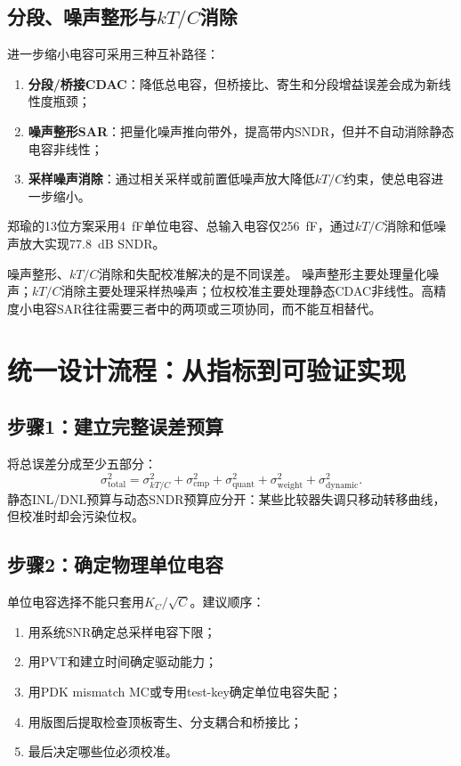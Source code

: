 \documentclass[UTF8,a4paper,11pt]{ctexart}
\begin{document}
\subsection{分段、噪声整形与\texorpdfstring{$kT/C$}{kT/C}消除}

进一步缩小电容可采用三种互补路径：
\begin{enumerate}
  \item \textbf{分段/桥接CDAC}：降低总电容，但桥接比、寄生和分段增益误差会成为新线性度瓶颈；
  \item \textbf{噪声整形SAR}：把量化噪声推向带外，提高带内SNDR，但并不自动消除静态电容非线性；
  \item \textbf{采样噪声消除}：通过相关采样或前置低噪声放大降低$kT/C$约束，使总电容进一步缩小。
\end{enumerate}
郑瑜的13位方案采用\SI{4}{fF}单位电容、总输入电容仅\SI{256}{fF}，通过$kT/C$消除和低噪声放大实现\SI{77.8}{dB} SNDR。\cite{zheng2024}

\begin{warnbox}{噪声整形、$kT/C$消除和失配校准解决的是不同误差。}
噪声整形主要处理量化噪声；$kT/C$消除主要处理采样热噪声；位权校准主要处理静态CDAC非线性。高精度小电容SAR往往需要三者中的两项或三项协同，而不能互相替代。
\end{warnbox}

\section{统一设计流程：从指标到可验证实现}

\subsection{步骤1：建立完整误差预算}

将总误差分成至少五部分：
\begin{equation}
\sigma_{\mathrm{total}}^2=
\sigma_{kT/C}^2+
\sigma_{\mathrm{cmp}}^2+
\sigma_{\mathrm{quant}}^2+
\sigma_{\mathrm{weight}}^2+
\sigma_{\mathrm{dynamic}}^2.
\end{equation}
静态INL/DNL预算与动态SNDR预算应分开：某些比较器失调只移动转移曲线，但校准时却会污染位权。

\subsection{步骤2：确定物理单位电容}

单位电容选择不能只套用$K_C/\sqrt C$。建议顺序：
\begin{enumerate}
  \item 用系统SNR确定总采样电容下限；
  \item 用PVT和建立时间确定驱动能力；
  \item 用PDK mismatch MC或专用test-key确定单位电容失配；
  \item 用版图后提取检查顶板寄生、分支耦合和桥接比；
  \item 最后决定哪些位必须校准。
\end{enumerate}
\end{document}
